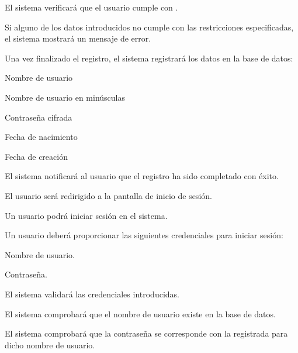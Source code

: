 \begin{RFGestionUsuarios}
\begin{RFGestionUsuarios}
\begin{RFGestionUsuarios}
				\item El sistema verificará que el usuario cumple con .
			\end{RFGestionUsuarios}
		\item Si alguno de los datos introducidos no cumple con las restricciones especificadas, el sistema mostrará un mensaje de error.
		\item Una vez finalizado el registro, el sistema registrará los datos en la base de datos:
			\begin{RFGestionUsuarios}
				\item Nombre de usuario
				\item Nombre de usuario en minúsculas
				\item Contraseña cifrada
				\item Fecha de nacimiento
				\item Fecha de creación
				\item {}
				\item {}
				\item {}
			\end{RFGestionUsuarios}
		\item El sistema notificará al usuario que el registro ha sido completado con éxito.
		\item El usuario será redirigido a la pantalla de inicio de sesión.
	\end{RFGestionUsuarios}

	\item Un usuario podrá iniciar sesión en el sistema.\label{req_inicio_sesion}
    \begin{RFGestionUsuarios}%
      \item Un usuario deberá proporcionar las siguientes credenciales para iniciar sesión:
		\begin{RFGestionUsuarios}
		  \item Nombre de usuario.
		  \item Contraseña.
		\end{RFGestionUsuarios}
	  \item El sistema validará las credenciales introducidas.
		\begin{RFGestionUsuarios}
			\item El sistema comprobará que el nombre de usuario existe en la base de datos.
			\item El sistema comprobará que la contraseña se corresponde con la registrada para dicho nombre de usuario.
		\end{RFGestionUsuarios}


\end{RFGestionUsuarios}
\end{RFGestionUsuarios}
